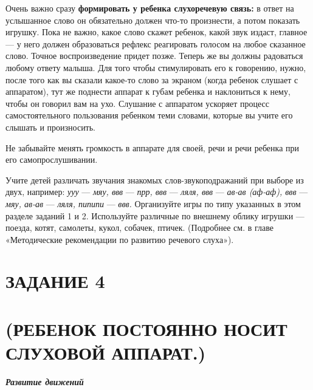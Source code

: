 \documentclass{book}
\renewcommand{\emph}[1]{\textit{#1}}
\begin{document}
Очень важно сразу \textbf{формировать у ребенка слухоречевую связь:} в
ответ на услышанное слово он обязательно должен что-то произнести, а
потом показать игрушку. Пока не важно, какое слово скажет ребенок, какой
звук издаст, главное --- у него должен образоваться рефлекс реагировать
голосом на любое сказанное слово. Точное воспроизведение придет позже.
Теперь же вы должны радоваться любому ответу малыша. Для того чтобы
стимулировать его к говорению, нужно, после того как вы сказали какое-то
слово за экраном (когда ребенок слушает с аппаратом), тут же поднести
аппарат к губам ребенка и наклониться к нему, чтобы он говорил вам на
ухо. Слушание с аппаратом ускоряет процесс самостоятельного пользования
ребенком теми словами, которые вы учите его слышать и произносить.

Не забывайте менять громкость в аппарате для своей, речи и речи ребенка
при его самопрослушивании.

Учите детей различать звучания знакомых слов-звукоподражаний при выборе
из двух, например: \emph{ууу} --- \emph{мяу, ввв} --- \emph{прр, ввв}
--- \emph{ляля, ввв} --- \emph{ав-ав (аф-аф), ввв} --- \emph{мяу, ав-ав}
--- \emph{ляля, пипипи} --- \emph{ввв.} Организуйте игры по типу
указанных в этом разделе заданий 1 и 2. Используйте различные по
внешнему облику игрушки --- поезда, котят, самолеты, кукол, собачек,
птичек. (Подробнее см. в главе «Методические рекомендации по развитию
речевого слуха»).

\section{ЗАДАНИЕ 4}\section*{(РЕБЕНОК ПОСТОЯННО НОСИТ СЛУХОВОЙ АППАРАТ.)}

\emph{\textbf{Развитие движений}}
\end{document}
